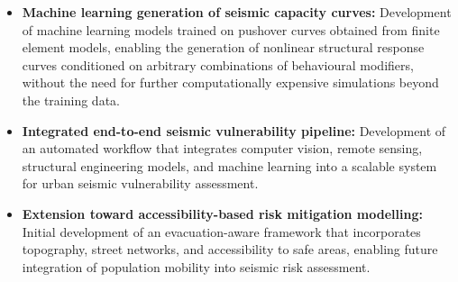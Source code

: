 \begin{itemize}
    \item \textbf{Machine learning generation of seismic capacity curves:}
    Development of machine learning models trained on pushover curves obtained from finite element models, enabling the generation of nonlinear structural response curves conditioned on arbitrary combinations of behavioural modifiers, without the need for further computationally expensive simulations beyond the training data.
    
    \item \textbf{Integrated end-to-end seismic vulnerability pipeline:}
    Development of an automated workflow that integrates computer vision, remote sensing, structural engineering models, and machine learning into a scalable system for urban seismic vulnerability assessment.

    \item \textbf{Extension toward accessibility-based risk mitigation modelling:}
    Initial development of an evacuation-aware framework that incorporates topography, street networks, and accessibility to safe areas, enabling future integration of population mobility into seismic risk assessment.

\end{itemize}